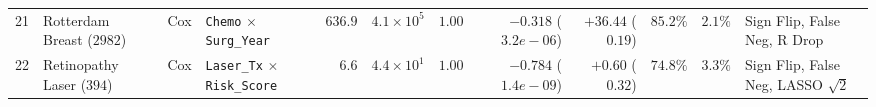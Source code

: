 \begin{table}[!t]
\begin{threeparttable}
{\begin{tabular}{@{}r l l l r r r r r r r l@{}}
21 & Rotterdam Breast \cite{Royston2013} ($2982$) & Cox      & \texttt{Chemo} $\times$ \texttt{Surg\_Year} & $636.9$ & $4.1\times 10^{5}$ & $\bm{1.00}$ & $\bm{-0.318}$ ($3.2e-06$) & $+36.44$ ($\bm{0.19}$) & $85.2\%$ & $\bm{2.1\%}$ & Sign Flip, False Neg, R Drop \\
22 & Retinopathy Laser \cite{DRS1976} ($394$) & Cox      & \texttt{Laser\_Tx} $\times$ \texttt{Risk\_Score} & $6.6$ & $4.4\times 10^{1}$ & $\bm{1.00}$ & $\bm{-0.784}$ ($1.4e-09$) & $+0.60$ ($\bm{0.32}$) & $74.8\%$ & $\bm{3.3\%}$ & Sign Flip, False Neg, LASSO $\sqrt{2}$ \\
\bottomrule
\end{tabular}%
}
\end{threeparttable}
\end{table}

